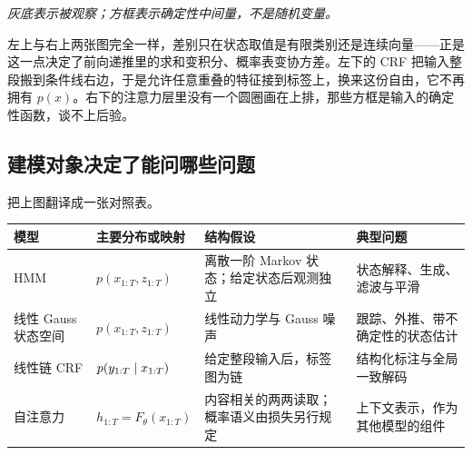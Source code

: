 \begin{center}
\end{center}

\emph{灰底表示被观察；方框表示确定性中间量，不是随机变量。}

左上与右上两张图完全一样，差别只在状态取值是有限类别还是连续向量——正是这一点决定了前向递推里的求和变积分、概率表变协方差。左下的 CRF 把输入整段搬到条件线右边，于是允许任意重叠的特征接到标签上，换来这份自由，它不再拥有 \(p(x)\)。右下的注意力层里没有一个圆圈画在上排，那些方框是输入的确定性函数，谈不上后验。

\subsection{建模对象决定了能问哪些问题}

把上图翻译成一张对照表。

\begin{center}
\begin{tabular}{p{}p{}p{}p{}}
\toprule
模型 & 主要分布或映射 & 结构假设 & 典型问题 \\
\midrule
HMM &
\(p(x_{1:T},z_{1:T})\) &
离散一阶 Markov 状态；给定状态后观测独立 &
状态解释、生成、滤波与平滑 \\
线性 Gauss 状态空间 &
\(p(x_{1:T},z_{1:T})\) &
线性动力学与 Gauss 噪声 &
跟踪、外推、带不确定性的状态估计 \\
线性链 CRF &
\(p(y_{1:T}\mid x_{1:T})\) &
给定整段输入后，标签图为链 &
结构化标注与全局一致解码 \\
自注意力 &
\(h_{1:T}=F_\theta(x_{1:T})\) &
内容相关的两两读取；概率语义由损失另行规定 &
上下文表示，作为其他模型的组件 \\
\bottomrule
\end{tabular}
\end{center}

